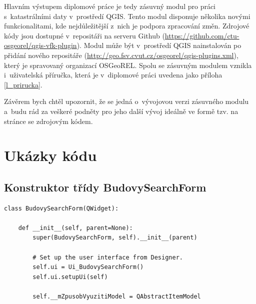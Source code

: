 \documentclass[a4paper,12pt,oneside]{book}
\begin{document}
Hlavním výstupem diplomové práce je tedy zásuvný modul pro práci
s~katastrálními daty v~prostředí QGIS. Tento modul disponuje několika
novými funkcionalitami, kde nejdůležitější z~nich je podpora
zpracování změn. Zdrojové kódy jsou dostupné v~repositáři na serveru
Github (\url{https://github.com/ctu-osgeorel/qgis-vfk-plugin}). Modul
může být v~prostředí QGIS nainstalován po přidání nového repositáře
(\url{http://geo.fsv.cvut.cz/osgeorel/qgis-plugins.xml}), který je
spravovaný organizací OSGeoREL. Spolu se zásuvným modulem vznikla
i~uživatelská příručka, která je v~diplomové práci uvedena jako
příloha \ref{l_prirucka}.

Závěrem bych chtěl upozornit, že se jedná o~vývojovou verzi zásuvného
modulu a~budu rád za veškeré podněty pro jeho další vývoj ideálně ve formě
tzv.  na stránce se zdrojovým kódem.



\clearpage
\rhead{{\rightmark}}	%
\renewcommand{\refname}{Použitá literatura}



\clearpage
\listoffigures

\clearpage
\listoftables

\clearpage
\lstlistoflistings

\newpage
\appendix

\setcounter{page}{1}   	%

\chapter{Ukázky kódu}

\section{Konstruktor třídy BudovySearchForm}

{\scriptsize
\begin{lstlisting}[style=python, label=l_budovySearchForm_konstruktor]
class BudovySearchForm(QWidget):

    def __init__(self, parent=None):
        super(BudovySearchForm, self).__init__(parent)

        # Set up the user interface from Designer.
        self.ui = Ui_BudovySearchForm()
        self.ui.setupUi(self)

        self.__mZpusobVyuzitiModel = QAbstractItemModel
\end{lstlisting}
}
\end{document}
